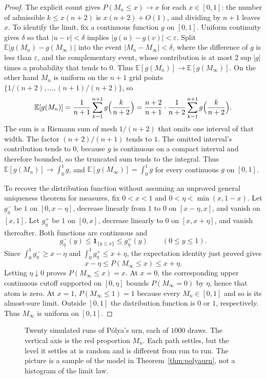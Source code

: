 \begin{proof}
The explicit count gives $P(M_n\le x)\to x$ for each $x\in[0,1]$: the number of admissible $k\le x(n+2)$ is $x(n+2)+O(1)$, and dividing by $n+1$ leaves $x$. To identify the limit, fix a continuous function $g$ on $[0,1]$. Uniform continuity gives $\delta$ so that $|u-v|<\delta$ implies $|g(u)-g(v)|<\varepsilon$. Split $\mathbb E|g(M_n)-g(M_\infty)|$ into the event $|M_n-M_\infty|<\delta$, where the difference of $g$ is less than $\varepsilon$, and the complementary event, whose contribution is at most $2\sup|g|$ times a probability that tends to $0$. Thus $\mathbb E[g(M_n)]\to\mathbb E[g(M_\infty)]$. On the other hand $M_n$ is uniform on the $n+1$ grid points $\{1/(n+2),\ldots,(n+1)/(n+2)\}$, so
\[
 \mathbb E[g(M_n)]=\frac{1}{n+1}\sum_{k=1}^{n+1}g\Bigl(\frac{k}{n+2}\Bigr)
 =\frac{n+2}{n+1}\cdot\frac{1}{n+2}\sum_{k=1}^{n+1}g\Bigl(\frac{k}{n+2}\Bigr).
\]
The sum is a Riemann sum of mesh $1/(n+2)$ that omits one interval of that width. The factor $(n+2)/(n+1)$ tends to $1$. The omitted interval's contribution tends to $0$, because $g$ is continuous on a compact interval and therefore bounded, so the truncated sum tends to the integral. Thus $\mathbb E[g(M_n)]\to\int_0^1 g$, and $\mathbb E[g(M_\infty)]=\int_0^1 g$ for every continuous $g$ on $[0,1]$.

To recover the distribution function without assuming an unproved general uniqueness theorem for measures, fix $0<x<1$ and $0<\eta<\min(x,1-x)$. Let $g^-_\eta$ be $1$ on $[0,x-\eta]$, decrease linearly from $1$ to $0$ on $[x-\eta,x]$, and vanish on $[x,1]$. Let $g^+_\eta$ be $1$ on $[0,x]$, decrease linearly to $0$ on $[x,x+\eta]$, and vanish thereafter. Both functions are continuous and
\[
 g^-_\eta(y)\le\mathbf1_{\{y\le x\}}\le g^+_\eta(y)
 \qquad(0\le y\le1).
\]
Since $\int_0^1g^-_\eta\ge x-\eta$ and $\int_0^1g^+_\eta\le x+\eta$, the expectation identity just proved gives
\[
 x-\eta\le P(M_\infty\le x)\le x+\eta.
\]
Letting $\eta\downarrow0$ proves $P(M_\infty\le x)=x$. At $x=0$, the corresponding upper continuous cutoff supported on $[0,\eta]$ bounds $P(M_\infty=0)$ by $\eta$, hence that atom is zero. At $x=1$, $P(M_\infty\le1)=1$ because every $M_n\in[0,1]$ and so is its almost-sure limit. Outside $[0,1]$ the distribution function is $0$ or $1$, respectively. Thus $M_\infty$ is uniform on $[0,1]$.
\end{proof}

\begin{figure}[ht]
\centering
{}
\caption{Twenty simulated runs of P\'olya's urn, each of $1000$ draws. The vertical axis is the red proportion $M_n$. Each path settles, but the level it settles at is random and is different from run to run. The picture is a sample of the model in Theorem~\ref{thm:polyaurn}, not a histogram of the limit law.}
\label{fig:polya}
\end{figure}

